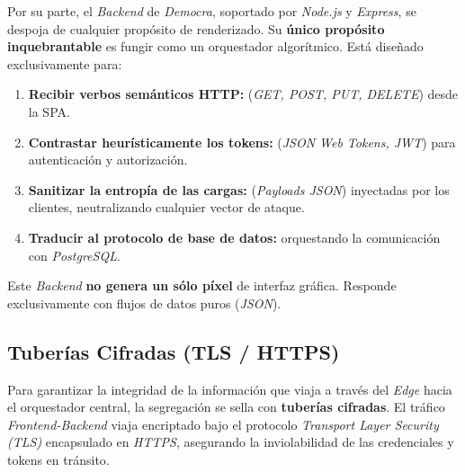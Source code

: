Por su parte, el \textit{Backend} de \textit{Democra}, soportado por \textit{Node.js} y \textit{Express}, se despoja de cualquier prop\'osito de renderizado. Su \textbf{\'unico prop\'osito inquebrantable} es fungir como un orquestador algor\'itmico. Est\'a dise\~nado exclusivamente para:
\begin{enumerate}
    \item \textbf{Recibir verbos sem\'anticos HTTP:} (\textit{GET, POST, PUT, DELETE}) desde la SPA.
    \item \textbf{Contrastar heur\'isticamente los tokens:} (\textit{JSON Web Tokens, JWT}) para autenticaci\'on y autorizaci\'on.
    \item \textbf{Sanitizar la entrop\'ia de las cargas:} (\textit{Payloads JSON}) inyectadas por los clientes, neutralizando cualquier vector de ataque.
    \item \textbf{Traducir al protocolo de base de datos:} orquestando la comunicaci\'on con \textit{PostgreSQL}.
\end{enumerate}

Este \textit{Backend} \textbf{no genera un s\'olo p\'ixel} de interfaz gr\'afica. Responde exclusivamente con flujos de datos puros (\textit{JSON}).

\subsection{Tuber\'ias Cifradas (TLS / HTTPS)}

Para garantizar la integridad de la informaci\'on que viaja a trav\'es del \textit{Edge} hacia el orquestador central, la segregaci\'on se sella con \textbf{tuber\'ias cifradas}. El tr\'afico \textit{Frontend-Backend} viaja encriptado bajo el protocolo \textit{Transport Layer Security (TLS)} encapsulado en \textit{HTTPS}, asegurando la inviolabilidad de las credenciales y tokens en tr\'ansito.
